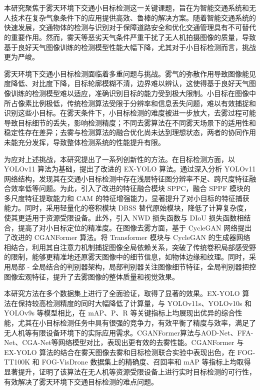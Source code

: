 \section*{\ArticleTitle}
\begin{cnabstract}
\fontsize{14pt}{17.5pt}\selectfont %

本研究聚焦于雾天环境下交通小目标检测这一关键课题，旨在为智能交通系统和无人技术在复杂气象条件下的应用提供高效、鲁棒的解决方案。随着智能交通系统的快速发展，交通物体的检测与识别对于保障道路安全和优化交通管理具有不可替代的重要作用。然而，雾天等恶劣天气条件严重干扰了无人机拍摄图像的质量，导致基于良好天气图像训练的检测模型性能大幅下降，尤其对于小目标检测而言，挑战更为严峻。

雾天环境下交通小目标检测面临着多重问题与挑战。雾气的弥散作用导致图像能见度降低、对比度下降，目标轮廓模糊不清，边界难以辨认，这使得基于良好天气图像训练的检测模型难以适应，准确识别目标的能力受到极大限制。小目标在图像中所占像素比例极低，传统检测算法受限于分辨率和信息丢失问题，难以有效捕捉和识别这些小目标。在雾天条件下，小目标检测的难度被进一步放大，去雾过程可能导致目标细节的丢失，影响检测精度；不同去雾算法在不同雾天场景下的适用性和稳定性存在差异；去雾与检测算法的融合优化尚未达到理想状态，两者的协同作用未能充分发挥，导致整体检测系统的性能提升有限。

为应对上述挑战，本研究提出了一系列创新性的方法。在目标检测方面，以 YOLOv11 算法为基础，提出了改进的 EX-YOLO 算法。通过深入分析 YOLOv11 网络结构，发现其在交通小目标检测中存在浅层特征图分辨率不足、跨尺度特征融合效率低等问题。为此，引入了改进的特征融合模块 SPPC，融合 SPPF 模块的多尺度特征提取能力和 CAM 的特征增强能力，显著提升了对小目标的特征捕获能力。同时，采用轻量化的卷积模块 DBSS 替代原始模块，降低了计算复杂度，使其更适用于资源受限设备。此外，引入 NWD 损失函数与 DIoU 损失函数相结合，提高了对小目标定位的精准度。在图像去雾方面，基于 CycleGAN 网络提出了改进的 CGANFormer 算法。将 Transformer 模块与 CycleGAN 的生成器网络相结合，利用其自注意力机制捕捉图像全局依赖关系，突破了传统卷积局部感受野的限制，能够更精准地还原雾天图像中的细节信息，如物体边缘和纹理。同时，采用局部 - 全局结合的判别器架构，局部判别器关注图像细节特征，全局判别器把控图像宏观特征，提升了去雾图像的整体质量和视觉效果。

本研究方法在多个数据集上进行了全面验证，取得了显著的效果。EX-YOLO 算法在保持较高检测精度的同时大幅降低了计算量，与 YOLOv11s、YOLOv10s 和 YOLOv9s 等模型相比，在 mAP、P、R 等关键指标上均展现出优异的综合性能，尤其在小目标检测任务中具有很强的竞争力，有效平衡了精度与效率，满足了无人机等有限设备环境下的实际应用需求。CGANFormer算法与AOD-Net、FFA-Net、CGA-Net等网络模型对比，表现出更有效的去雾性能。CGANFormer 与 EX-YOLO 算法的结合在雾天图像去雾和目标检测联合实验中表现出色，在 FOG-TT100K 和 FOG-VisDrone 数据集上的精确度、召回率和 mAP 等指标上均取得显著提升，证明了该算法在无人机等资源受限设备上进行实时目标检测的可行性，有效解决了雾天环境下交通目标检测的难点问题。


\end{cnabstract}
